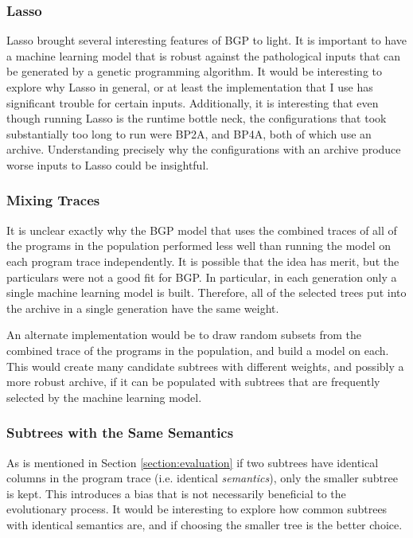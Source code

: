 \subsubsection{Lasso}
Lasso brought several interesting features of BGP to light.  It is important to have a machine learning model that is robust against the pathological inputs that can be generated by a genetic programming algorithm.  It would be interesting to explore why Lasso in general, or at least the implementation that I use has significant trouble for certain inputs.  Additionally, it is interesting that even though running Lasso is the runtime bottle neck, the configurations that took substantially too long to run were BP2A, and BP4A, both of which use an archive.  Understanding precisely why the configurations with an archive produce worse inputs to Lasso could be insightful.

\subsubsection{Mixing Traces}
It is unclear exactly why the BGP model that uses the combined traces of all of the programs in the population performed less well than running the model on each program trace independently.  It is possible that the idea has merit, but the particulars were not a good fit for BGP.  In particular, in each generation only a single machine learning model is built.  Therefore, all of the selected trees put into the archive in a single generation have the same weight.

An alternate implementation would be to draw random subsets from the combined trace of the programs in the population, and build a model on each.  This would create many candidate subtrees with different weights, and possibly a more robust archive, if it can be populated with subtrees that are frequently selected by the machine learning model.

\subsubsection{Subtrees with the Same Semantics}
As is mentioned in Section \ref{section:evaluation} if two subtrees have identical columns in the program trace (i.e. identical \textit{semantics}), only the smaller subtree is kept.  This introduces a bias that is not necessarily beneficial to the evolutionary process.  It would be interesting to explore how common subtrees with identical semantics are, and if choosing the smaller tree is the better choice.

